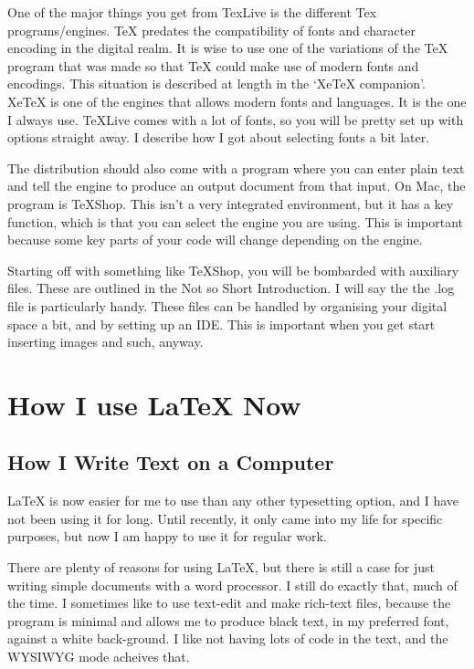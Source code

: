 \documentclass[11pt, oneside]{memoir}
\begin{document}
One of the major things you get from TexLive is the different Tex programs/engines. TeX predates the compatibility of fonts and character encoding in the digital realm. It is wise to use one of the variations of the TeX program that was made so that TeX could make use of modern fonts and encodings. This situation is described at length in the `XeTeX companion'. XeTeX is one of the engines that allows modern fonts and languages. It is the one I always use. TeXLive comes with a lot of fonts, so you will be pretty set up with options straight away. I describe how I got about selecting fonts a bit later.

The distribution should also come with a program where you can enter plain text and tell the engine to produce an output document from that input. On Mac, the program is TeXShop. This isn't a very integrated environment, but it has a key function, which is that you can select the engine you are using. This is important because some key parts of your code will change depending on the engine.

Starting off with something like TeXShop, you will be bombarded with auxiliary files. These are outlined in the Not so Short Introduction. I will say the the .log file is particularly handy. These files can be handled by organising your digital space a bit, and by setting up an IDE. This is important when you get start inserting images and such, anyway.

\section{How I use LaTeX Now}

\subsection{How I Write Text on a Computer}

LaTeX is now easier for me to use than any other typesetting option, and I have not been using it for long. Until recently, it only came into my life for specific purposes, but now I am happy to use it for regular work.

There are plenty of reasons for using LaTeX, but there is still a case for just writing simple documents with a word processor. I still do exactly that, much of the time. I sometimes like to use text-edit and make rich-text files, because the program is minimal and allows me to produce black text, in my preferred font, against a white back-ground. I like not having lots of code in the text, and the WYSIWYG mode acheives that.
\end{document}
